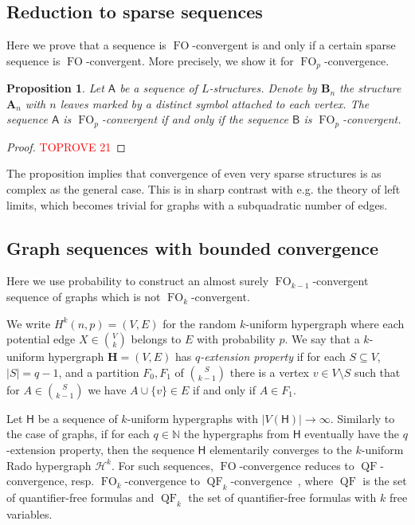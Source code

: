 \documentclass[11pt]{article}
\theoremstyle{plain}
\newtheorem{proposition}[theorem]{Proposition}
\theoremstyle{definition}
\theoremstyle{remark}
\newcommand{\N}{\mathbb{N}}
\DeclareMathOperator\FO{FO}
\DeclareMathOperator\QF{QF}
\newcommand{\str}[1]{\mathbf{#1}}
\newcommand{\strseq}[1]{{\boldsymbol{\mathsf{#1}}}}
\begin{document}
\subsection{Reduction to sparse sequences}\label{ssec:sparse_sequences}

Here we prove that a sequence is $\FO$-convergent is and only if a certain sparse sequence is $\FO$-convergent.
More precisely, we show it for $\FO_p$-convergence.

\begin{proposition}\label{prop:reduction_to_sparse}
    Let $\strseq{A}$ be a sequence of $L$-structures.
    Denote by $\str{B}_n$ the structure $\str{A}_n$ with $n$ leaves marked by a distinct symbol attached to each vertex.
    The sequence $\strseq{A}$ is $\FO_p$-convergent if and only if the sequence $\strseq{B}$ is $\FO_p$-convergent.
\end{proposition}
\begin{proof}\textcolor{red}{TOPROVE 21}\end{proof}

The proposition implies that convergence of even very sparse structures is as complex as the general case.
This is in sharp contrast with e.g. the theory of left limits, which becomes trivial for graphs with a subquadratic number of edges.

\subsection{Graph sequences with bounded convergence}\label{ssec:bounded_convergence}

Here we use probability to construct an almost surely $\FO_{k-1}$-convergent sequence of graphs which is not $\FO_k$-convergent.

We write $H^k(n,p) = (V, E)$ for the random $k$-uniform hypergraph where each potential edge $X \in \binom{V}{k}$ belongs to $E$ with probability $p$.
We say that a $k$-uniform hypergraph $\str{H} = (V, E)$ has \emph{$q$-extension property} if for each $S \subseteq V$, $|S| = q-1$, and a partition $F_0, F_1$ of $\binom{S}{k-1}$ there is a vertex $v \in V \setminus S$ such that for $A \in \binom{S}{k-1}$ we have $A \cup \{v\} \in E$ if and only if $A \in F_1$.

Let $\strseq{H}$ be a sequence of $k$-uniform hypergraphs with $|V(\strseq{H})| \to \infty$.
Similarly to the case of graphs, if for each $q \in \N$ the hypergraphs from $\strseq{H}$ eventually have the $q$-extension property, then the sequence $\strseq{H}$ elementarily converges to the $k$-uniform Rado hypergraph $\mathcal{H}^k$.
For such sequences, $\FO$-convergence reduces to $\QF$-convergence, resp. $\FO_k$-convergence to $\QF_k$-convergence~\cite[Lemma~2.28]{unified_approach}, where $\QF$ is the set of quantifier-free formulas and $\QF_k$ the set of quantifier-free formulas with $k$ free variables.
\end{document}
